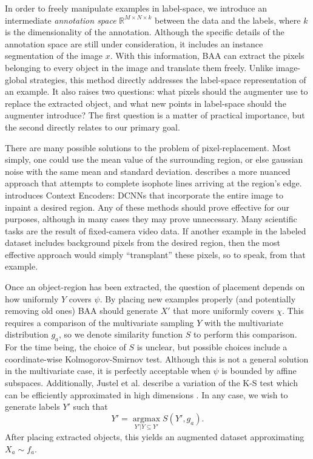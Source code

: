 \documentclass[10pt, journal]{IEEEtran}
\DeclareMathOperator{\argmax}{argmax}
\begin{document}
In order to freely manipulate examples in label-space, we introduce an
intermediate \emph{annotation space} $\mathbb{R}^{M\times N \times k}$ between
the data and the labels, where $k$ is the dimensionality of the
annotation. Although the specific details of the annotation space are still
under consideration, it includes an instance segmentation of the image $x$. With
this information, BAA can extract the pixels belonging to every object in the
image and translate them freely. Unlike image-global strategies, this method
directly addresses the label-space representation of an example. It also raises
two questions: what pixels should the augmenter use to replace the extracted
object, and what new points in label-space should the augmenter introduce? The
first question is a matter of practical importance, but the second directly
relates to our primary goal.

There are many possible solutions to the problem of pixel-replacement. Most
simply, one could use the mean value of the surrounding region, or else gaussian
noise with the same mean and standard deviation. \cite{bertalmio_image_2000}
describes a more nuanced approach that attempts to complete isophote lines
arriving at the region's edge. \cite{pathak_context_2016} introduces Context
Encoders: DCNNs that incorporate the entire image to inpaint a desired
region. Any of these methods should prove effective for our purposes, although
in many cases they may prove unnecessary. Many scientific tasks are the result
of fixed-camera video data. If another example in the labeled dataset includes
background pixels from the desired region, then the most effective approach
would simply ``transplant'' these pixels, so to speak, from that example.

Once an object-region has been extracted, the question of placement depends on
how uniformly $Y$ covers $\psi$. By placing new examples properly (and
potentially removing old ones) BAA should generate $X'$ that more uniformly
covers $\chi$. This requires a comparison of the multivariate sampling $Y$ with
the multivariate distribution $g_a$, so we denote similarity function $S$ to
perform this comparison. For the time being, the choice of $S$ is unclear, but
possible choices include a coordinate-wise Kolmogorov-Smirnov test. Although
this is not a general solution in the multivariate case, it is perfectly
acceptable when $\psi$ is bounded by affine subspaces. Additionally, Justel et
al. describe a variation of the K-S test which can be efficiently approximated
in high dimensions \cite{justel_multivariate_1997}. In any case, we wish to
generate labels $Y'$ such that
\[ Y' = \underset{Y' | Y \subseteq Y'}{\argmax} S(Y', g_a). \] After placing
extracted objects, this yields an augmented dataset approximating
$X_a \sim f_a$.
\end{document}
